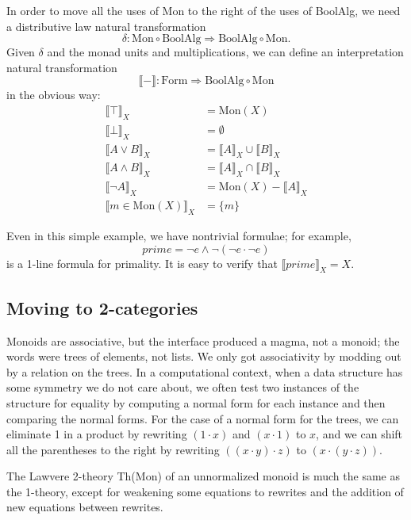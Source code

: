 \documentclass{article}
\newcommand{\interp}[1]{\llbracket #1 \rrbracket}
\newcommand{\maps}{\colon}
\newcommand{\Mon}{\mathrm{Mon}}
\newcommand{\BoolAlg}{\mathrm{BoolAlg}}
\newcommand{\Form}{\mathrm{Form}}
\begin{document}
In order to move all the uses of Mon to the right of the uses of BoolAlg, we need a distributive law natural transformation
\[ \delta\maps \Mon \circ \BoolAlg \Rightarrow \BoolAlg \circ \Mon. \]
Given $\delta$ and the monad units and multiplications, we can define an interpretation natural transformation
\[ \interp{-}\maps \Form\Rightarrow \BoolAlg \circ \Mon \]
in the obvious way:
\begin{align*}
  \interp{\top}_X &= \Mon(X)\\
  \interp{\bot}_X &= \emptyset\\
  \interp{{A}\lor{B}}_X &= \interp{A}_X \cup \interp{B}_X\\
  \interp{{A}\land{B}}_X &= \interp{A}_X \cap \interp{B}_X\\
  \interp{\neg A}_X &= \Mon(X) - \interp{A}_X\\
  \interp{m \in \Mon(X)}_X &= \{m\}
\end{align*}

Even in this simple example, we have nontrivial formulae; for example,
\[ prime = \neg e \land \neg(\neg e \cdot \neg e) \]
is a 1-line formula for primality.  It is easy to verify that $\interp{prime}_X = X.$

\subsection{Moving to 2-categories}

Monoids are associative, but the interface produced a magma, not a monoid; the words were trees of elements, not lists.  We only got associativity by modding out by a relation on the trees.  In a computational context, when a data structure has some symmetry we do not care about, we often test two instances of the structure for equality by computing a normal form for each instance and then comparing the normal forms.  For the case of a normal form for the trees, we can eliminate 1 in a product by rewriting $(1 \cdot x)$ and $(x \cdot 1)$ to $x$, and we can shift all the parentheses to the right by rewriting $((x \cdot y) \cdot z)$ to $(x \cdot (y \cdot z)).$

The Lawvere 2-theory Th(Mon) of an unnormalized monoid is much the same as the 1-theory, except for weakening some equations to rewrites and the addition of new equations between rewrites.
\end{document}

